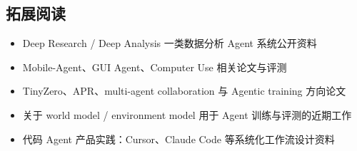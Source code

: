 \subsection{拓展阅读}
\begin{itemize}
  \item Deep Research / Deep Analysis 一类数据分析 Agent 系统公开资料
  \item Mobile-Agent、GUI Agent、Computer Use 相关论文与评测
  \item TinyZero、APR、multi-agent collaboration 与 Agentic training 方向论文
  \item 关于 world model / environment model 用于 Agent 训练与评测的近期工作
  \item 代码 Agent 产品实践：Cursor、Claude Code 等系统化工作流设计资料
\end{itemize}


